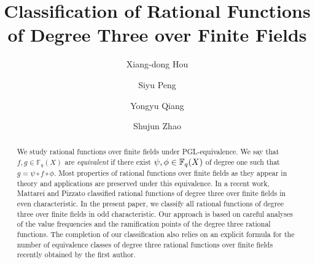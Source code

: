 \documentclass{amsart}
\numberwithin{equation}{section}
\theoremstyle{definition}
\newcommand{\f}{\Bbb F}
\newcommand{\F}{\mathbb{F}}
\begin{document}
\title[Classification of Rational Functions of Degree Three]{Classification of Rational Functions of Degree Three over Finite Fields}

\author[X. Hou]{Xiang-dong Hou}
\address{Department of Mathematics and Statistics,
University of South Florida, Tampa, FL 33620}

\author[S. Peng]{Siyu Peng}
\address{Department of Mathematics, Massachusetts Institute of Technology, Cambridge, MA 02139}

\author[Y. Qiang]{Yongyu Qiang}
\address{School of Mathematics, Georgia Institute of Technology, Atlanta, GA 30332}

\author[S. Zhao]{Shujun Zhao}
\address{Department of Mathematics and Statistics,
University of South Florida, Tampa, FL 33620}



\begin{abstract}
    We study rational functions over finite fields under PGL-equivalence. We say that $f, g \in \F_q(X)$ are \emph{equivalent} if there exist $\psi, \phi \in \f_q(X)$ of degree one such that $g = \psi \circ f \circ \phi$. Most properties of rational functions over finite fields as they appear in theory and applications are preserved under this equivalence. In a recent work, Mattarei and Pizzato classified rational functions of degree three over finite fields in even characteristic.    
In the present paper, we classify all rational functions of degree three over finite fields in odd characteristic. Our approach is based on careful analyses of the value frequencies and the ramification points of the degree three rational functions. The completion of our classification also relies on an explicit formula for the number of equivalence classes of degree three rational functions over finite fields recently obtained by the first author.  
\end{abstract}

\maketitle

\tableofcontents

\end{document}
